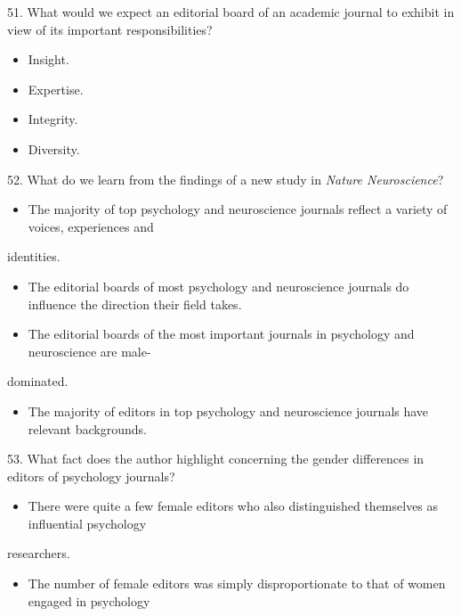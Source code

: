 \documentclass[UTF8,11pt]{ctexart}
\begin{document}
51. What would we expect an editorial board of an academic journal to exhibit in view of its important responsibilities?


\begin{itemize}[leftmargin=2em,itemsep=.2em,topsep=.4em]\item[A.] Insight.
\item[B.] Expertise.
\item[C.] Integrity.
\item[D.] Diversity.
\end{itemize}

52. What do we learn from the findings of a new study in \textit{Nature Neuroscience}?


\begin{itemize}[leftmargin=2em,itemsep=.2em,topsep=.4em]\item[A.] The majority of top psychology and neuroscience journals reflect a variety of voices, experiences and
\end{itemize}

identities.


\begin{itemize}[leftmargin=2em,itemsep=.2em,topsep=.4em]\item[B.] The editorial boards of most psychology and neuroscience journals do influence the direction their field takes.
\item[C.] The editorial boards of the most important journals in psychology and neuroscience are male-
\end{itemize}

dominated.


\begin{itemize}[leftmargin=2em,itemsep=.2em,topsep=.4em]\item[D.] The majority of editors in top psychology and neuroscience journals have relevant backgrounds.
\end{itemize}

53. What fact does the author highlight concerning the gender differences in editors of psychology journals?


\begin{itemize}[leftmargin=2em,itemsep=.2em,topsep=.4em]\item[A.] There were quite a few female editors who also distinguished themselves as influential psychology
\end{itemize}

researchers.


\begin{itemize}[leftmargin=2em,itemsep=.2em,topsep=.4em]\item[B.] The number of female editors was simply disproportionate to that of women engaged in psychology
\end{itemize}
\end{document}
